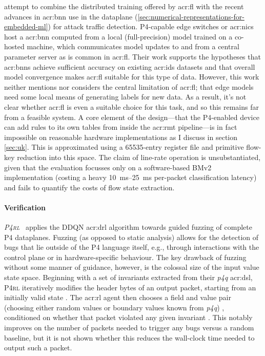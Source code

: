 \Textcite{DBLP:conf/networking/QinPLT20} attempt to combine the distributed training offered by \gls{acr:fl} with the recent advances in \gls{acr:bnn} use in the dataplane (\cref{sec:numerical-representations-for-embedded-ml}) for attack traffic detection.
P4-capable edge switches or \glspl{acr:nic} host a \gls{acr:bnn} computed from a local (full-precision) model trained on a co-hosted machine, which communicates model updates to and from a central parameter server as is common in \gls{acr:fl}.
Their work supports the hypotheses that \glspl{acr:bnn} achieve sufficient accuracy on existing \gls{acr:ids} datasets and that overall model convergence makes \gls{acr:fl} suitable for this type of data.
However, this work neither mentions nor considers the central limitation of \gls{acr:fl}; that edge models need some local means of generating labels for new data.
As a result, it's not clear whether \gls{acr:fl} is even a suitable choice for this task, and so this remains far from a feasible system.
A core element of the design---that the P4-enabled device can add rules to its own tables from inside the \gls{acr:rmt} pipeline---is in fact impossible on reasonable hardware implementations as I discuss in section \cref{sec:uk}.
This is approximated using a \num{65535}-entry register file and primitive flow-key reduction into this space.
The claim of line-rate operation is unsubstantiated, given that the evaluation focusses only on a software-based BMv2 implementation (costing a heavy \qtyrange{10}{25}{\milli\second} per-packet classification latency) and fails to quantify the costs of flow state extraction.

\paragraph{Verification}
\emph{\textsc{P4rl}}~\parencite{DBLP:conf/sigcomm/ShuklaHH019} applies the DDQN \gls{acr:drl} algorithm towards guided fuzzing of complete P4 dataplanes.
Fuzzing (as opposed to static analysis) allows for the detection of bugs that lie outside of the P4 language itself, e.g., through interactions with the control plane or in hardware-specific behaviour.
The key drawback of fuzzing without some manner of guidance, however, is the colossal size of the input value state space.
Beginning with a set of invariants extracted from their \emph{p4q} \gls{acr:dsl}, \textsc{P4rl} iteratively modifies the header bytes of an output packet, starting from an initially valid state \prllitstate{}.
The \gls{acr:rl} agent then chooses a field and value pair (choosing either random values or boundary values known from \emph{p4q}) \prllitact{}, conditioned on whether that packet violated any given invariant \prllitreward{}.
This notably improves on the number of packets needed to trigger any bugs versus a random baseline, but it is not shown whether this reduces the wall-clock time needed to output such a packet.

